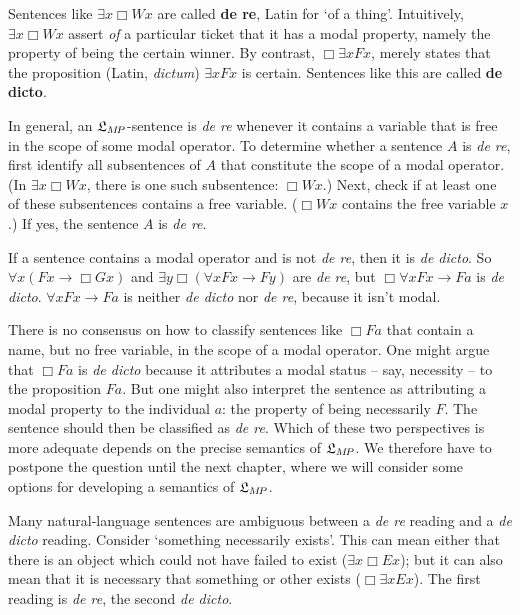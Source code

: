 Sentences like $\exists x \Box Wx$ are called \textbf{de re}, Latin for `of a
thing'. Intuitively, $\exists x \Box Wx$ assert \emph{of} a particular ticket
that it has a modal property, namely the property of being the certain winner.
By contrast, $\Box \exists x Fx$, merely states that the proposition (Latin,
\emph{dictum}) $\exists x Fx$ is certain. Sentences like this are called
\textbf{de dicto}.

In general, an $\mathfrak{L}_{M\!P}$-sentence is \emph{de re} whenever it contains a
variable that is free in the scope of some modal operator. To determine
whether a sentence $A$ is \emph{de re}, first identify all subsentences of $A$
that constitute the scope of a modal operator. (In $\exists x \Box Wx$, there is
one such subsentence: $\Box Wx$.) Next, check if at least one of these
subsentences contains a free variable. ($\Box Wx$ contains the free variable
$x$.) If yes, the sentence $A$ is \emph{de re}.

If a sentence contains a modal operator and is not \emph{de re}, then it is
\emph{de dicto}. So $\forall x (Fx \to \Box Gx)$ and
$\exists y\Box (\forall x Fx \to Fy)$ are \emph{de re}, but
$\Box \forall x Fx \to Fa$ is \emph{de dicto}. $\forall x Fx \to Fa$ is neither
\emph{de dicto} nor \emph{de re}, because it isn't modal.

There is no consensus on how to classify sentences like $\Box Fa$ that contain
a name, but no free variable, in the scope of a modal operator. One might argue
that $\Box Fa$ is \emph{de dicto} because it attributes a modal status -- say,
necessity -- to the proposition $Fa$. But one might also interpret the sentence
as attributing a modal property to the individual $a$: the property of being
necessarily $F$. The sentence should then be classified as \emph{de re}. Which
of these two perspectives is more adequate depends on the precise semantics of
$\mathfrak{L}_{M\!P}$. We therefore have to postpone the question until the next chapter,
where we will consider some options for developing a semantics of $\mathfrak{L}_{M\!P}$.


Many natural-language sentences are ambiguous between a \emph{de re} reading and
a \emph{de dicto} reading. Consider `something necessarily exists'. This can
mean either that there is an object which could not have failed to exist
($\exists x \Box Ex$); but it can also mean that it is necessary that something
or other exists ($\Box \exists x Ex$). The first reading is \emph{de re}, the
second \emph{de dicto}.

